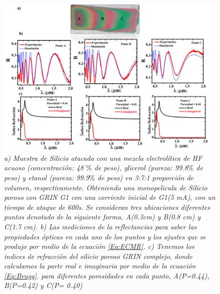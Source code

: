 \documentclass[a4paper,11pt,]{book}
\begin{document}
\begin{figure}[H]
	\centering
	\includegraphics[scale=.35]{../Images/SPgrin51}
	\caption{\emph{a) Muestra de Silicio atacada  con una mezcla electrolítica de HF acuoso (concentración: 48 $ \% $ de peso), glicerol (pureza: 99.8$ \% $ de peso) y etanol (pureza: 99.9$ \% $ de peso) en 3:7:1 proporción de volumen, respectivamente. Obteniendo una  monopelicula de Silicio poroso con GRIN G1 con una corriente inicial  de G1(5 mA), con un tiempo de ataque de  600s.  Se consideran tres ubicaciones diferentes puntos denotado de la siguiente forma,  A(0.3cm) y  B(0.8 cm) y  C(1.7 cm). b) Las mediciones de la reflectancias para saber las propiedades ópticas en cada uno de los puntos y los ajustes que se produjo por medio de la ecuación \ref{Eq:ECMR}. c) Tenemos los indices de refracción del silicio poroso GRIN complejo, donde calculamos la parte real e imaginaria por medio de la ecuación \ref{Eq:Brugg}. para diferentes porosidades en cada punto, A(P=0.44), B(P=0.42) y C(P= 0.40) } }
	\label{fig:DR3}
\end{figure} 
\end{document}
